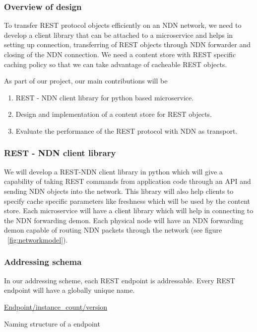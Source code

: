 \subsubsection{Overview of design }

To transfer REST protocol objects efficiently on an NDN network, we need to develop a client library that can be attached to a microservice and helps in setting up connection, transferring of REST objects through NDN forwarder and closing of the NDN connection. We need a content store with REST specific caching policy so that we can take advantage of cacheable REST objects.

As part of our project, our main contributions will be

\begin{enumerate}
\item REST - NDN client library for python based microservice.
\item Design and implementation of a content store for REST objects.
\item Evaluate the performance of the REST protocol with NDN as transport.
\end{enumerate}

\subsubsection{REST - NDN client library}

We will develop a REST-NDN client library in python which will give a capability of taking REST commands from application code through an API and sending NDN objects into the network. This library will also help clients to specify cache specific parameters like freshness which will be used by the content store. Each microservice will have a client library which will help in connecting to the NDN forwarding demon. Each physical node will have an NDN forwarding demon capable of routing NDN packets through the network (see figure  ~\ref{fig:networkmodel}).

\subsubsection{Addressing schema}

In our addressing scheme, each REST endpoint is addressable. Every REST endpoint will have a globally unique name. 

\begin{center} \url{ Endpoint/instance_count/version  } \end{center}
\begin{center} Naming structure of a endpoint  \end{center}

